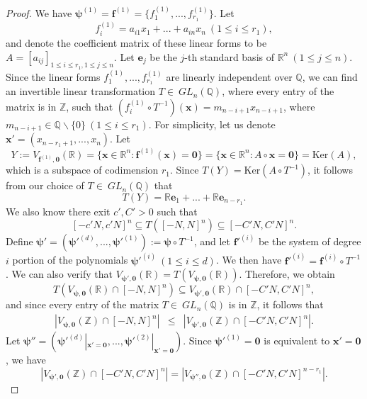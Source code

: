 \documentclass[12pt]{amsart}
\theoremstyle{definition}
\theoremstyle{remark}
\numberwithin{equation}{section}
\begin{document}
\begin{proof}
We have $\boldsymbol{\psi}^{(1)} = \mathbf{f}^{(1)} = \{f_1^{(1)}, ..., f_{r_1}^{(1)} \}$. Let
$$
f_i^{(1)} = a_{i1}x_1+ ... + a_{in}x_n \ (1 \leq i \leq r_1),
$$
and denote the coefficient matrix of these linear forms to be $A = [a_{ij}]_{1\leq i \leq r_1, 1 \leq j \leq n}$.
Let $\mathbf{e}_{j}$ be the $j$-th standard basis of $\mathbb{R}^n \ (1 \leq j \leq n)$.
Since the linear forms $f_1^{(1)}, ..., f_{r_1}^{(1)}$ are linearly independent over $\mathbb{Q}$,
we can find an invertible linear transformation $T \in \ GL_n(\mathbb{Q})$,
where every entry of the matrix is in $\mathbb{Z}$, such that
$(f^{(1)}_i \circ T^{-1})(\mathbf{x}) = m_{n-i + 1 } x_{n-i+1}$, where $m_{n-i + 1 } \in \mathbb{Q} \backslash \{0\}  \ (1 \leq i \leq r_1)$.
For simplicity, let us denote $\mathbf{x}' = (x_{n-r_1+1}, ..., x_n)$.
Let
$$
Y:= V_{\mathbf{f}^{(1)}, \mathbf{0} } (\mathbb{R}) = \{ \mathbf{x} \in \mathbb{R}^n : \mathbf{f}^{(1)}(\mathbf{x}) = \mathbf{0} \} = \{ \mathbf{x} \in \mathbb{R}^n : A \circ \mathbf{x} = \mathbf{0} \} = \text{Ker}(A ),
$$
which is a subspace of codimension $r_1$. Since $T(Y) = \text{Ker}(A \circ T^{-1})$, it follows from our choice of $T \in \ GL_n(\mathbb{Q})$ that
$$
T(Y) = \mathbb{R} \mathbf{e}_1 + ... + \mathbb{R} \mathbf{e}_{n - r_1}.
$$
We also know there exit
$c' , C' > 0$ such that
$$
[-c'N, c'N]^n \subseteq T( [-N, N]^n) \subseteq   [-C'N,C'N]^n.
$$
Define $\boldsymbol{\psi}' = (\boldsymbol{\psi'}^{(d)}, ..., \boldsymbol{\psi'}^{(1)}) := \boldsymbol{\psi} \circ T^{-1}$, and let $\mathbf{f'}^{(i)}$ be the system of degree $i$ portion of the polynomials $\boldsymbol{\psi'}^{(i)} \ (1 \leq i \leq d)$. We then have $\mathbf{f'}^{(i)} = \mathbf{f}^{(i)} \circ T^{-1}$.
We can also verify that $V_{\boldsymbol{\psi}', \mathbf{0} } (\mathbb{R}) = T ( V_{\boldsymbol{\psi}, \mathbf{0} } (\mathbb{R}) ).$
Therefore, we obtain
$$
T( V_{\boldsymbol{\psi}, \mathbf{0} }(\mathbb{R}) \cap [-N, N]^n )  \subseteq V_{\boldsymbol{\psi}', \mathbf{0} }(\mathbb{R}) \cap [-C' N, C' N]^n,
$$
and since every entry of the matrix $T \in \ GL_n(\mathbb{Q})$ is in $\mathbb{Z}$, it follows that
\begin{eqnarray}
| V_{\boldsymbol{\psi}, \mathbf{0} } (\mathbb{Z})\cap [-N, N]^n   |
&\leq&  |V_{\boldsymbol{\psi}', \mathbf{0} }(\mathbb{Z}) \cap [-C' N, C' N]^n  |.
\label{eqn 1 in cor 3.3}
\end{eqnarray}
Let $\boldsymbol{\psi''} = (\boldsymbol{\psi'}^{(d)} |_{{\mathbf{x}' = \mathbf{0}}}, ..., \boldsymbol{\psi'}^{(2)}|_{{\mathbf{x}' = \mathbf{0}}} )$.
Since $\boldsymbol{\psi' }^{(1)} = \mathbf{0}$ is equivalent to $\mathbf{x}' = \mathbf{0}$, we have
\begin{equation}
\label{eqn 1' in cor 3.3}
|V_{\boldsymbol{\psi}', \mathbf{0} }(\mathbb{Z}) \cap [-C' N, C' N]^n  |
= |V_{\boldsymbol{\psi}'', \mathbf{0} }(\mathbb{Z}) \cap [-C' N, C' N]^{n-r_1}  |.
\end{equation}


\end{proof}
\end{document}
